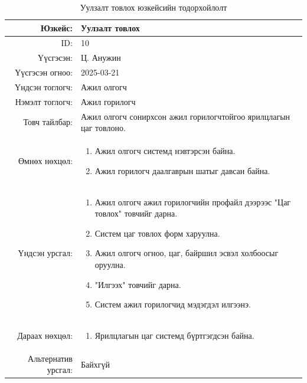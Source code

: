 \begin{longtable}{|r|p{11.5cm}|}
    \caption{Уулзалт товлох юзкейсийн тодорхойлолт}
    \label{table:usecase10}\\ \hline
    {Юзкейс:} & {Уулзалт товлох}\\ \hline
    {ID:} & {10}\\ \hline
    {Үүсгэсэн:} & {Ц. Анужин}\\ \hline
    {Үүсгэсэн огноо:} & {2025-03-21}\\ \hline
    {Үндсэн тоглогч:} & {Ажил олгогч}\\ \hline
    {Нэмэлт тоглогч:} & {Ажил горилогч}\\ \hline
    {Товч тайлбар:} & {Ажил олгогч сонирхсон ажил горилогчтойгоо ярилцлагын цаг товлоно.}\\ \hline
    {Өмнөх нөхцөл:} & {\begin{enumerate}[nosep]
        \item Ажил олгогч системд нэвтэрсэн байна.
        \item Ажил горилогч даалгаврын шатыг давсан байна.
    \end{enumerate}}\\ \hline
    {Үндсэн урсгал:} & {\begin{enumerate}[nosep]
        \item Ажил олгогч ажил горилогчийн профайл дээрээс "Цаг товлох" товчийг дарна.
        \item Систем цаг товлох форм харуулна.
        \item Ажил олгогч огноо, цаг, байршил эсвэл холбоосыг оруулна.
        \item "Илгээх" товчийг дарна.
        \item Систем ажил горилогчид мэдэгдэл илгээнэ.
    \end{enumerate}}\\ \hline
    {Дараах нөхцөл:} & {\begin{enumerate}[nosep]
        \item Ярилцлагын цаг системд бүртгэгдсэн байна.
    \end{enumerate}}\\ \hline
    {Альтернатив урсгал:} & {Байхгүй}\\ \hline
\end{longtable}

